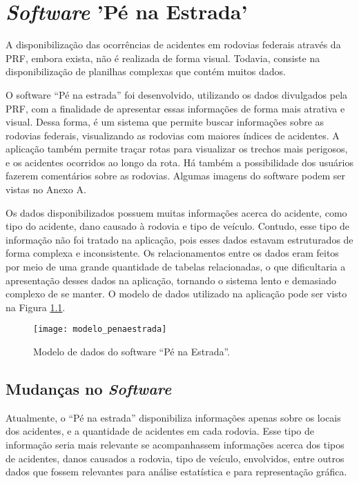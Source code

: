 \chapter{\textit{Software} 'Pé na Estrada'}

A disponibilização das ocorrências de acidentes em rodovias federais através da PRF,
embora exista, não é realizada de forma visual. Todavia, consiste na disponibilização de
planilhas complexas que contém muitos dados.

O software “Pé na estrada” foi desenvolvido, utilizando os dados divulgados pela
PRF, com a finalidade de apresentar essas informações de forma mais atrativa e visual. Dessa
forma, é um sistema que permite buscar informações sobre as rodovias federais, visualizando
as rodovias com maiores índices de acidentes. A aplicação também permite traçar rotas para
visualizar os trechos mais perigosos, e os acidentes ocorridos ao longo da rota. Há também a
possibilidade dos usuários fazerem comentários sobre as rodovias. Algumas imagens do
software podem ser vistas no Anexo A.

Os dados disponibilizados possuem muitas informações acerca do acidente, como tipo
do acidente, dano causado à rodovia e tipo de veículo. Contudo, esse tipo de informação não
foi tratado na aplicação, pois esses dados estavam estruturados de forma complexa e
inconsistente. Os relacionamentos entre os dados eram feitos por meio de uma grande
quantidade de tabelas relacionadas, o que dificultaria a apresentação desses dados na
aplicação, tornando o sistema lento e demasiado complexo de se manter. O modelo de dados
utilizado na aplicação pode ser visto na Figura \ref{fig:modelo_penaestrada}.

\begin{figure}[!htb]
 \centering
 \texttt{[image: modelo\_penaestrada]}
 \caption[Modelo de dados do software “Pé na Estrada”]{Modelo de dados do software “Pé na Estrada”.}
 \label{fig:modelo_penaestrada}
\end{figure}

  \section{Mudanças no \textit{Software}}
  
    Atualmente, o “Pé na estrada” disponibiliza informações apenas sobre os locais dos
    acidentes, e a quantidade de acidentes em cada rodovia. Esse tipo de informação seria mais
    relevante se acompanhassem informações acerca dos tipos de acidentes, danos causados a
    rodovia, tipo de veículo, envolvidos, entre outros dados que fossem relevantes para análise
    estatística e para representação gráfica.

